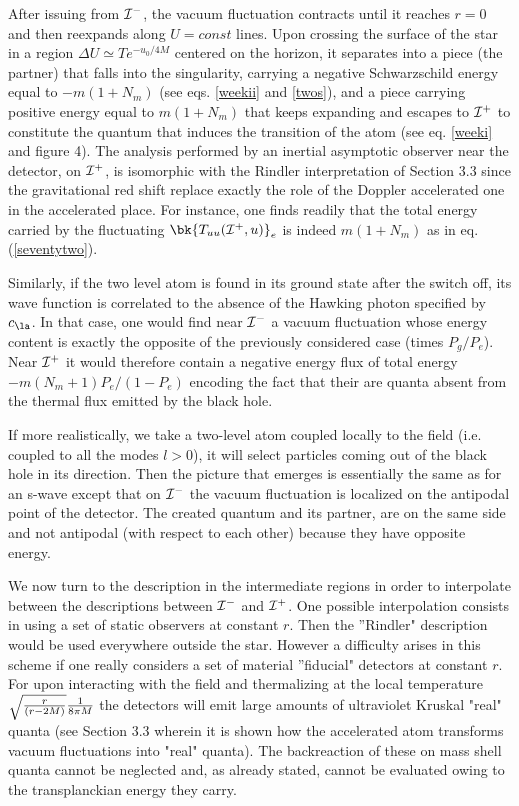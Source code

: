 \documentclass[12pt]{article}
\begin{document}
After issuing from ${\cal I}^-$, the vacuum fluctuation
 contracts until it reaches $r=0$ and then reexpands along $U=const$
lines. Upon crossing the
surface of the star in a region $\Delta U \simeq T e^{-u_0/4M}$
centered on the horizon,
it separates
into a piece (the partner)
that
falls into the singularity,
carrying a negative Schwarzschild
energy equal to $- m(1+N_m)$ (see eqs. \ref{weekii} and \ref{twos}),
and a piece carrying positive
energy equal to $ m(1+N_m)$ that keeps expanding and escapes to ${\cal
I}^+$ to constitute the quantum that induces the
transition of the atom (see eq. \ref{weeki} and figure 4).
The analysis performed by an inertial asymptotic observer near the
detector, on ${\cal
I}^+$,
is isomorphic with
the Rindler interpretation of Section 3.3 since the gravitational red shift
replace exactly the role of the Doppler accelerated one in
the accelerated place.
For instance, one finds readily that the total energy carried by the
fluctuating $\bk{T_{uu}({\cal I^+},u)}_{e}$ is indeed $m(1+N_m)$ as in
eq. (\ref{seventytwo}).

Similarly, if the two level atom is found
in its ground state
 after the switch off,
its wave function
is correlated to the absence of the Hawking photon specified by $c_\la$.
In that case, one would find near ${\cal I}^-$ a vacuum fluctuation whose
energy content is exactly the opposite of the previously considered
case (times $P_g/P_e$).
Near ${\cal I}^+$ it
would therefore
contain a negative energy flux of total energy $-
 m (N_m + 1) P_e/ (1- P_e)$  encoding the fact that their are quanta
absent from the thermal flux emitted by the black hole.

If more realistically, we take
a two-level atom coupled locally to the field
(i.e. coupled to all the modes $l>0$),
 it
will
select
particles coming out of the black hole in its direction. Then the picture
that emerges is essentially the same as for
an s-wave
except that on ${\cal I}^-$ the vacuum fluctuation is localized
on the antipodal point of the detector.
The  created quantum and its partner,
 are on the same side and
not antipodal
(with respect to each other)
because they have opposite energy.

We now turn to the description in the intermediate regions in order to
interpolate between the descriptions between
${\cal I}^-$ and ${\cal I}^+$.
One possible interpolation
consists in using a set of static observers at constant $r$.
Then the ''Rindler" description would be used everywhere outside the
star. However a difficulty arises in this scheme if one really considers a
set of material ''fiducial" \cite{sus1}
detectors
at constant $r$. For upon interacting
with the field and thermalizing at the local temperature
$\sqrt{r\over(r-2M)}{1 \over 8 \pi M}$ the
detectors will emit large amounts of
ultraviolet Kruskal
"real"
quanta (see Section 3.3 wherein it is shown how the accelerated atom
transforms vacuum fluctuations into "real" quanta). The backreaction of
these
on mass shell quanta
cannot be neglected and, as already stated, cannot be evaluated
owing to the transplanckian energy
they carry.
\end{document}
